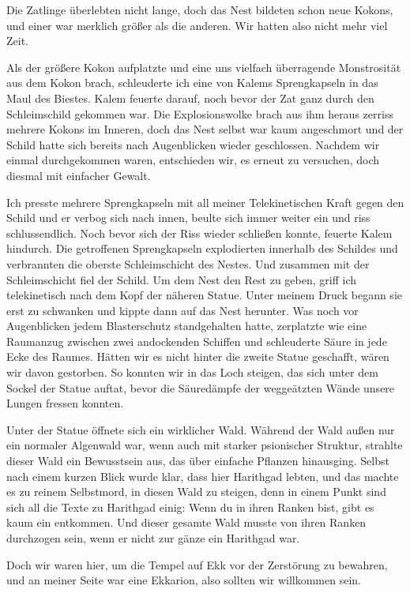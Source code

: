 \documentclass[11pt]{scrartcl}
\begin{document}
Die Zatlinge überlebten nicht lange, doch das Nest bildeten schon neue
Kokons, und einer war merklich größer als die anderen. Wir hatten also
nicht mehr viel Zeit.

Als der größere Kokon aufplatzte und eine uns vielfach überragende
Monstrosität aus dem Kokon brach, schleuderte ich eine von Kalems
Sprengkapseln in das Maul des Biestes. Kalem feuerte darauf, noch bevor
der Zat ganz durch den Schleimschild gekommen war. Die Explosionswolke
brach aus ihm heraus zerriss mehrere Kokons im Inneren, doch das Nest
selbst war kaum angeschmort und der Schild hatte sich bereits nach
Augenblicken wieder geschlossen. Nachdem wir einmal durchgekommen waren,
entschieden wir, es erneut zu versuchen, doch diesmal mit einfacher
Gewalt.

Ich presste mehrere Sprengkapseln mit all meiner Telekinetischen Kraft
gegen den Schild und er verbog sich nach innen, beulte sich immer weiter
ein und riss schlussendlich. Noch bevor sich der Riss wieder schließen
konnte, feuerte Kalem hindurch. Die getroffenen Sprengkapseln
explodierten innerhalb des Schildes und verbrannten die oberste
Schleimschicht des Nestes. Und zusammen mit der Schleimschicht fiel der
Schild. Um dem Nest den Rest zu geben, griff ich telekinetisch nach dem
Kopf der näheren Statue. Unter meinem Druck begann sie erst zu schwanken
und kippte dann auf das Nest herunter. Was noch vor Augenblicken jedem
Blasterschutz standgehalten hatte, zerplatzte wie eine Raumanzug
zwischen zwei andockenden Schiffen und schleuderte Säure in jede Ecke
des Raumes. Hätten wir es nicht hinter die zweite Statue geschafft,
wären wir davon gestorben. So konnten wir in das Loch steigen, das sich
unter dem Sockel der Statue auftat, bevor die Säuredämpfe der
weggeätzten Wände unsere Lungen fressen konnten.

Unter der Statue öffnete sich ein wirklicher Wald. Während der Wald
außen nur ein normaler Algenwald war, wenn auch mit starker psionischer
Struktur, strahlte dieser Wald ein Bewusstsein aus, das über einfache
Pflanzen hinausging. Selbst nach einem kurzen Blick wurde klar, dass
hier Harithgad lebten, und das machte es zu reinem Selbstmord, in diesen
Wald zu steigen, denn in einem Punkt sind sich all die Texte zu
Harithgad einig: Wenn du in ihren Ranken bist, gibt es kaum ein
entkommen. Und dieser gesamte Wald musste von ihren Ranken durchzogen
sein, wenn er nicht zur gänze ein Harithgad war.

Doch wir waren hier, um die Tempel auf Ekk vor der Zerstörung zu
bewahren, und an meiner Seite war eine Ekkarion, also sollten wir
willkommen sein.
\end{document}
